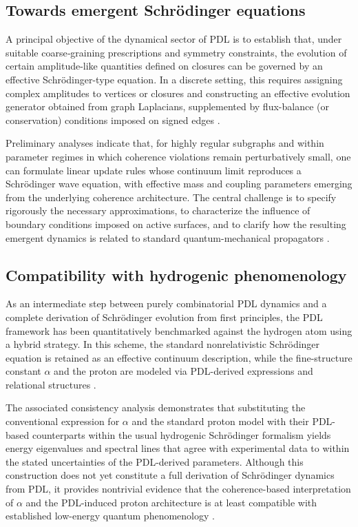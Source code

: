 \documentclass[11pt,a4paper]{article}
\begin{document}
\subsection{Towards emergent Schr\"odinger equations}
\label{subsec:emergent_schrodinger}

A principal objective of the dynamical sector of PDL is to establish that, under suitable coarse‑graining prescriptions and symmetry constraints, the evolution of certain amplitude-like quantities defined on closures can be governed by an effective Schr\"odinger-type equation. In a discrete setting, this requires assigning complex amplitudes to vertices or closures and constructing an effective evolution generator obtained from graph Laplacians, supplemented by flux-balance (or conservation) conditions imposed on signed edges \citep{Coherence_Leakage_18_2026,Coherence_Leakage_18_2026}.

Preliminary analyses indicate that, for highly regular subgraphs and within parameter regimes in which coherence violations remain perturbatively small, one can formulate linear update rules whose continuum limit reproduces a Schr\"odinger wave equation, with effective mass and coupling parameters emerging from the underlying coherence architecture. The central challenge is to specify rigorously the necessary approximations, to characterize the influence of boundary conditions imposed on active surfaces, and to clarify how the resulting emergent dynamics is related to standard quantum-mechanical propagators \citep{Coherence_Leakage_18_2026,PDL_position}.

\subsection{Compatibility with hydrogenic phenomenology}
\label{subsec:hydrogen_compatibility}

As an intermediate step between purely combinatorial PDL dynamics and a complete derivation of Schrödinger evolution from first principles, the PDL framework has been quantitatively benchmarked against the hydrogen atom using a hybrid strategy. In this scheme, the standard nonrelativistic Schrödinger equation is retained as an effective continuum description, while the fine-structure constant \(\alpha\) and the proton are modeled via PDL-derived expressions and relational structures \citep{Schrodinger_Sketch_v2_2026}.

The associated consistency analysis demonstrates that substituting the conventional expression for \(\alpha\) and the standard proton model with their PDL-based counterparts within the usual hydrogenic Schrödinger formalism yields energy eigenvalues and spectral lines that agree with experimental data to within the stated uncertainties of the PDL-derived parameters. Although this construction does not yet constitute a full derivation of Schrödinger dynamics from PDL, it provides nontrivial evidence that the coherence-based interpretation of \(\alpha\) and the PDL-induced proton architecture is at least compatible with established low-energy quantum phenomenology \citep{Schrodinger_Sketch_v2_2026,PDL_position}.
\end{document}
